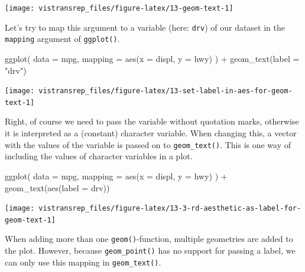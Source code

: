 \documentclass[]{book}
\newenvironment{Shaded}{}{}
\newcommand{\DataTypeTok}[1]{#1}
\newcommand{\KeywordTok}[1]{\textcolor[rgb]{0.00,0.00,1.00}{#1}}
\newcommand{\NormalTok}[1]{#1}
\newcommand{\OperatorTok}[1]{#1}
\newcommand{\StringTok}[1]{\textcolor[rgb]{0.00,0.50,0.50}{#1}}
\begin{document}
\begin{flushright}\texttt{[image: vistransrep\_files/figure-latex/13-geom-text-1]} \end{flushright}

Let's try to map this argument to a variable (here: \texttt{drv}) of our dataset in the \texttt{mapping} argument of \texttt{ggplot()}.

\begin{Shaded}
\begin{Highlighting}[]
\KeywordTok{ggplot}\NormalTok{(}
  \DataTypeTok{data =}\NormalTok{ mpg,}
  \DataTypeTok{mapping =} \KeywordTok{aes}\NormalTok{(}\DataTypeTok{x =}\NormalTok{ displ, }\DataTypeTok{y =}\NormalTok{ hwy)}
\NormalTok{) }\OperatorTok{+}
\StringTok{  }\KeywordTok{geom_text}\NormalTok{(}\DataTypeTok{label =} \StringTok{"drv"}\NormalTok{)}
\end{Highlighting}
\end{Shaded}

\begin{flushright}\texttt{[image: vistransrep\_files/figure-latex/13-set-label-in-aes-for-geom-text-1]} \end{flushright}

Right, of course we need to pass the variable without quotation marks, otherwise it is interpreted as a (constant) character variable.
When changing this, a vector with the values of the variable is passed on to \texttt{geom\_text()}.
This is one way of including the values of character variables in a plot.

\begin{Shaded}
\begin{Highlighting}[]
\KeywordTok{ggplot}\NormalTok{(}
  \DataTypeTok{data =}\NormalTok{ mpg,}
  \DataTypeTok{mapping =} \KeywordTok{aes}\NormalTok{(}\DataTypeTok{x =}\NormalTok{ displ, }\DataTypeTok{y =}\NormalTok{ hwy)}
\NormalTok{) }\OperatorTok{+}
\StringTok{  }\KeywordTok{geom_text}\NormalTok{(}\KeywordTok{aes}\NormalTok{(}\DataTypeTok{label =}\NormalTok{ drv))}
\end{Highlighting}
\end{Shaded}

\begin{flushright}\texttt{[image: vistransrep\_files/figure-latex/13-3-rd-aesthetic-as-label-for-geom-text-1]} \end{flushright}

When adding more than one \texttt{geom()}-function, multiple geometries are added to the plot.
However, because \texttt{geom\_point()} has no support for passing a label, we can only use this mapping in \texttt{geom\_text()}.
\end{document}
